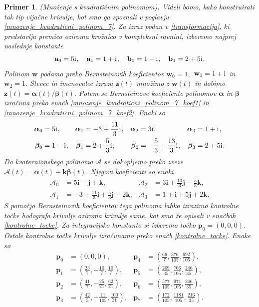 \documentclass[12pt,a4paper,twoside]{article}
\newcommand{\iu}{\mathrm{i}\mkern1mu} %
\theoremstyle{definition} %
\theoremstyle{plain} %
\theoremstyle{primerstyle}
\newtheorem{primer}[definicija]{Primer}
\numberwithin{equation}{section}  %
\newcommand{\aV}{\mathbf{a}}
\newcommand{\bV}{\mathbf{b}}
\newcommand{\pV}{\mathbf{p}}
\newcommand{\iV}{\mathbf{i}}
\newcommand{\jV}{\mathbf{j}}
\newcommand{\kV}{\mathbf{k}}
\newcommand{\wV}{\mathbf{w}}
\newcommand{\zV}{\mathbf{z}}
\newcommand{\AQ}{\mathcal{A}}
\newcommand{\balpha}{\boldsymbol \alpha}
\newcommand{\bbeta}{\boldsymbol \beta}
\begin{document}
\begin{primer}
	\label{primer2}
	\textnormal{ }(Množenje s kvadratičnim polinomom)\textbf{.}
	Videli bomo, kako konstruirati tak tip vijačne krivulje, kot smo ga spoznali v poglavju \ref{mnozenje_kvadraticni_polinom_7}. Za izraz podan v \eqref{transformacija}, ki predstavlja premico oziroma krožnico v kompleksni ravnini, izberemo najprej naslednje konstante
	\begin{equation*}
		\aV_0=5\iu,\quad\aV_1=1+\iu,\quad\bV_0=1-\iu,\quad\bV_1=2+5\iu.
	\end{equation*}
	Polinom $\wV$ podamo preko Bernsteinovih koeficientov $\wV_0=1,$ $\wV_1=1+\iu$ in $\wV_2=1.$ Števec in imenovalec izraza $\zV(t)$ množimo z $\wV(t)$ in dobimo $\zV(t)=\balpha(t)/\bbeta(t).$ Potem se Bernsteinove koeficiente polinomov $\balpha$ in $\bbeta$ izračuna preko enačb \eqref{mnozenje_kvadraticni_polinom_7_koef1} in \eqref{mnozenje_kvadraticni_polinom_7_koef2}. Enaki so
	\begin{align*}
		\balpha_0&=5\iu,&\balpha_1&=-3+\frac{11}{3}\iu,&\balpha_2&=3\iu,&\balpha_3&=1+\iu,\\
		\bbeta_0&=1-\iu,&\bbeta_1&=2+\frac{5}{3}\iu,&\bbeta_2&=-\frac{5}{3}+\frac{13}{3}\iu,&\bbeta_3&=2+5\iu.
	\end{align*}
	Do kvaternionskega polinoma $\AQ$ se dokopljemo preko zveze $\AQ(t)=\balpha(t)+\kV\bbeta(t).$ Njegovi koeficienti so enaki
	\begin{align*}
		\AQ_0&=5\iV-\jV+\kV,&\AQ_2&=3\iV+\frac{13}{3}\jV-\frac{5}{3}\kV,\\
		\AQ_1&=-3+\frac{11}{3}\iV+\frac{5}{3}\jV+2\kV,&\AQ_3&=1+\iV+5\jV+2\kV.
	\end{align*}
	S pomočjo Bernsteinovih koeficientov tega polinoma lahko izrazimo kontrolne točke hodografa krivulje oziroma krivulje same, kot smo že opisali v enačbah \eqref{kontrolne_tocke}.
	Za integracijsko konstanto si izberemo točko $\pV_0=(0,0,0).$ Ostale kontrolne točke krivulje izračunamo preko enačb \eqref{kontrolne_tocke}. Enake so
	\begin{align*}
		\pV_0&=(0,0,0),&\pV_4&=\left(\frac{66}{7},\frac{376}{105},\frac{692}{105}\right),\\
		\pV_1&=\left(\frac{23}{7},-\frac{10}{7},\frac{10}{7}\right),&\pV_5&=\left(\frac{269}{35},\frac{706}{105},\frac{246}{35}\right),\\
		\pV_2&=\left(\frac{41}{7},-\frac{25}{21},\frac{62}{21}\right),&\pV_6&=\left(\frac{577}{105},\frac{971}{105},\frac{246}{35}\right),\\
		\pV_3&=\left(\frac{42}{5},-\frac{11}{105},\frac{100}{21}\right),&\pV_7&=\left(\frac{172}{105},\frac{1181}{105},\frac{216}{35}\right).

\end{align*}
\end{primer}
\end{document}
